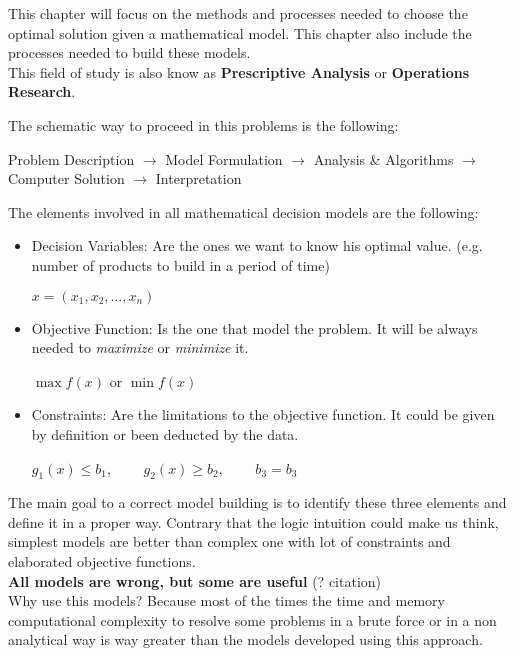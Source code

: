 This chapter will focus on the methods and processes needed to choose the optimal 
solution given a mathematical model. This chapter also include the processes needed to build these models.\\

This field of study is also know as \textbf{Prescriptive Analysis} or \textbf{Operations Research}.

The schematic way to proceed in this problems is the following:
\begin{center}
    Problem Description $\rightarrow$ Model Formulation $\rightarrow$ Analysis \& Algorithms $\rightarrow$
    Computer Solution $\rightarrow$ Interpretation
\end{center}

The elements involved in all mathematical decision models are the following:
\begin{itemize}
    \item Decision Variables: Are the ones we want to know his optimal value. (e.g. number of products to 
    build in a period of time)
    \begin{center}
        $x = (x_1, x_2, \dots , x_n)$
    \end{center}
    \item Objective Function: Is the one that model the problem. It will be always needed to \textit{maximize} or \textit{minimize} it.
    \begin{center}
        $\max f(x)$ or $\min f(x)$
    \end{center}
    \item Constraints: Are the limitations to the objective function. It could be given by definition or been deducted by the data. 
    \begin{center}
        $g_1(x)\leq b_1$, $\qquad g_2(x)\geq b_2$, $\qquad b_3=b_3$
    \end{center}
\end{itemize}

The main goal to a correct model building is to identify these three elements and define it in a proper way. Contrary that the logic 
intuition could make us think, simplest models are better than complex one with lot of constraints and elaborated objective functions. \\

\textbf{All models are wrong, but some are useful} (? citation)\\

Why use this models? Because most of the times the time and memory computational complexity to resolve some problems in a brute force
or in a non analytical way is way greater than the models developed using this approach.

